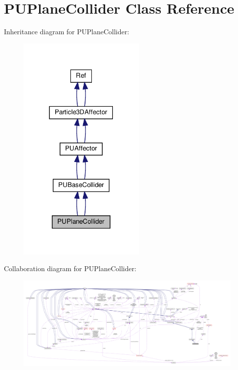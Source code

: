 \hypertarget{classPUPlaneCollider}{}\section{P\+U\+Plane\+Collider Class Reference}
\label{classPUPlaneCollider}


Inheritance diagram for P\+U\+Plane\+Collider\+:
\nopagebreak
\begin{figure}[H]
\begin{center}
\leavevmode
\includegraphics[width=177pt]{classPUPlaneCollider__inherit__graph}
\end{center}
\end{figure}


Collaboration diagram for P\+U\+Plane\+Collider\+:
\nopagebreak
\begin{figure}[H]
\begin{center}
\leavevmode
\includegraphics[width=350pt]{classPUPlaneCollider__coll__graph}
\end{center}
\end{figure}
